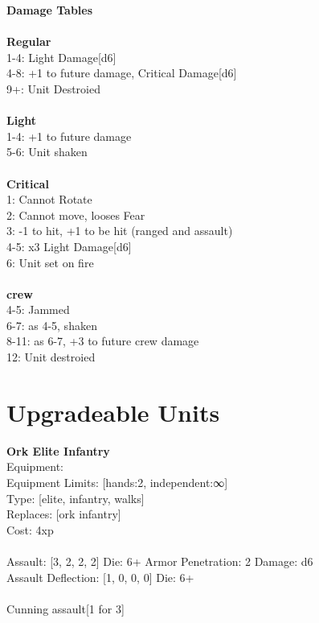 {\bf Damage Tables} \\
\ \\ {\bf Regular } \\
1-4: Light Damage[d6] \\
4-8: +1 to future damage, Critical Damage[d6] \\
9+: Unit Destroied \\
\ \\ {\bf Light } \\
1-4: +1 to future damage \\
5-6: Unit shaken \\
\ \\ {\bf Critical } \\
1: Cannot Rotate \\
2: Cannot move, looses Fear \\
3: -1 to hit, +1 to be hit (ranged and assault) \\
4-5: x3 Light Damage[d6] \\
6: Unit set on fire \\
\ \\ {\bf crew } \\
4-5: Jammed \\
6-7: as 4-5, shaken \\
8-11: as 6-7, +3 to future crew damage \\
12: Unit destroied \\










\pagebreak\section{Upgradeable Units}{\bf Ork Elite Infantry } \\
Equipment:  \\
Equipment Limits: [hands:2, independent:∞] \\
Type: [elite, infantry, walks] \\
Replaces: [ork infantry] \\
Cost: 4xp\\
\ \\
Assault: [3, 2, 2, 2] Die: 6+ Armor Penetration: 2 Damage: d6 \\
Assault Deflection: [1, 0, 0, 0] Die: 6+\\
\\ 
Cunning assault[1 for 3]\\ 
 
